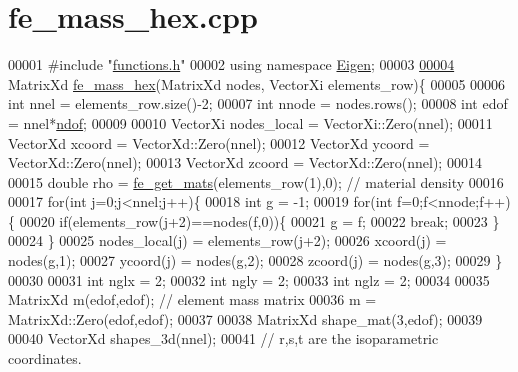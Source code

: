 \hypertarget{fe__mass__hex_8cpp_source}{}\section{fe\+\_\+mass\+\_\+hex.\+cpp}
\label{fe__mass__hex_8cpp_source}

\begin{DoxyCode}
00001 \textcolor{preprocessor}{#include "\hyperlink{functions_8h}{functions.h}"}
00002 \textcolor{keyword}{using namespace }\hyperlink{namespace_eigen}{Eigen};
00003 
\hyperlink{fe__mass__hex_8cpp_a0405e1196584e6fa36f29a2614a49f00}{00004} MatrixXd \hyperlink{fe__mass__hex_8cpp_a0405e1196584e6fa36f29a2614a49f00}{fe\_mass\_hex}(MatrixXd nodes, VectorXi elements\_row)\{
00005 
00006     \textcolor{keywordtype}{int} nnel = elements\_row.size()-2;
00007     \textcolor{keywordtype}{int} nnode = nodes.rows();
00008     \textcolor{keywordtype}{int} edof = nnel*\hyperlink{_global_variables_8h_aa789fe4d8a13fd0990b630909430d5d0}{ndof};
00009 
00010     VectorXi nodes\_local = VectorXi::Zero(nnel);
00011     VectorXd xcoord = VectorXd::Zero(nnel);
00012     VectorXd ycoord = VectorXd::Zero(nnel);
00013     VectorXd zcoord = VectorXd::Zero(nnel);
00014 
00015     \textcolor{keywordtype}{double} rho = \hyperlink{functions_8h_af7ffbad6dfcc99fc88b130c1a7b1720a}{fe\_get\_mats}(elements\_row(1),0); \textcolor{comment}{// material density}
00016 
00017     \textcolor{keywordflow}{for}(\textcolor{keywordtype}{int} j=0;j<nnel;j++)\{
00018         \textcolor{keywordtype}{int} g = -1;
00019         \textcolor{keywordflow}{for}(\textcolor{keywordtype}{int} f=0;f<nnode;f++)\{
00020             \textcolor{keywordflow}{if}(elements\_row(j+2)==nodes(f,0))\{
00021                 g = f;
00022                 \textcolor{keywordflow}{break};
00023             \}
00024         \}
00025         nodes\_local(j) = elements\_row(j+2);
00026         xcoord(j) = nodes(g,1);
00027         ycoord(j) = nodes(g,2);
00028         zcoord(j) = nodes(g,3);
00029     \}
00030 
00031     \textcolor{keywordtype}{int} nglx = 2;
00032     \textcolor{keywordtype}{int} ngly = 2;
00033     \textcolor{keywordtype}{int} nglz = 2;
00034 
00035     MatrixXd m(edof,edof); \textcolor{comment}{// element mass matrix}
00036     m = MatrixXd::Zero(edof,edof);
00037 
00038     MatrixXd shape\_mat(3,edof);
00039 
00040     VectorXd shapes\_3d(nnel);
00041     \textcolor{comment}{// r,s,t are the isoparametric coordinates.}

\end{DoxyCode}
